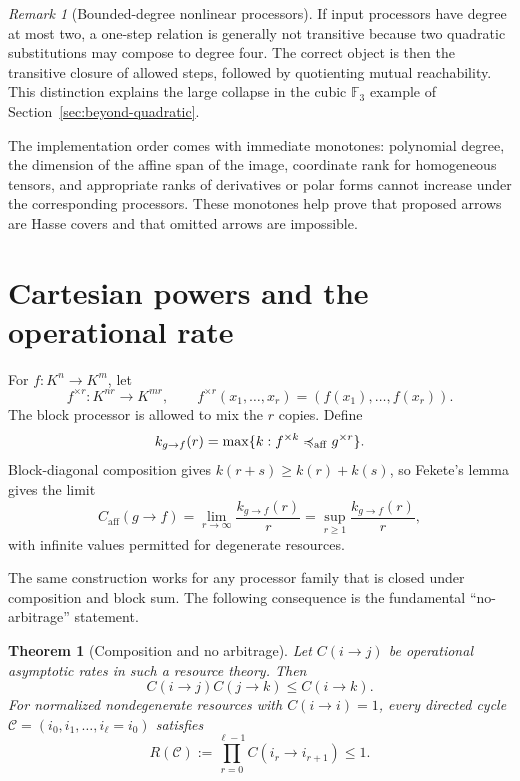 \documentclass[11pt]{article}
\theoremstyle{definition}
\theoremstyle{plain}
\newtheorem{theorem}[definition]{Theorem}
\theoremstyle{remark}
\newtheorem{remark}[definition]{Remark}
\newcommand{\F}{\mathbb F}
\newcommand{\impl}{\preccurlyeq}
\newcommand{\caff}{C_{\mathrm{aff}}}
\begin{document}
\begin{remark}[Bounded-degree nonlinear processors]
If input processors have degree at most two, a one-step relation is generally
not transitive because two quadratic substitutions may compose to degree
four.  The correct object is then the transitive closure of allowed steps,
followed by quotienting mutual reachability.  This distinction explains the
large collapse in the cubic \(\F_3\) example of
Section~\ref{sec:beyond-quadratic}.
\end{remark}

The implementation order comes with immediate monotones: polynomial degree,
the dimension of the affine span of the image, coordinate rank for homogeneous
tensors, and appropriate ranks of derivatives or polar forms cannot increase
under the corresponding processors.  These monotones help prove that proposed
arrows are Hasse covers and that omitted arrows are impossible.

\section{Cartesian powers and the operational rate}
\label{sec:rates}

For \(f:K^n\to K^m\), let
\[
  f^{\times r}:K^{nr}\longrightarrow K^{mr},
  \qquad
  f^{\times r}(x_1,\ldots,x_r)
  =(f(x_1),\ldots,f(x_r)).
\]
The block processor is allowed to mix the \(r\) copies.  Define
\[
  k_{g\to f}(r)
  =\max\{k:f^{\times k}\impl_{\rm aff}g^{\times r}\}.
\]
Block-diagonal composition gives
\(k(r+s)\ge k(r)+k(s)\), so Fekete's lemma gives the limit
\begin{equation}
  \caff(g\to f)
  =\lim_{r\to\infty}\frac{k_{g\to f}(r)}r
  =\sup_{r\ge1}\frac{k_{g\to f}(r)}r,
  \label{eq:affine-rate}
\end{equation}
with infinite values permitted for degenerate resources.

The same construction works for any processor family that is closed under
composition and block sum.  The following consequence is the fundamental
``no-arbitrage'' statement.

\begin{theorem}[Composition and no arbitrage]
Let \(C(i\to j)\) be operational asymptotic rates in such a resource theory.
Then
\begin{equation}
  C(i\to j)C(j\to k)\le C(i\to k).
  \label{eq:multiplicative-triangle}
\end{equation}
For normalized nondegenerate resources with \(C(i\to i)=1\), every directed
cycle \(\mathcal C=(i_0,i_1,\ldots,i_{\ell}=i_0)\) satisfies
\begin{equation}
  R(\mathcal C)
  :=\prod_{r=0}^{\ell-1}C(i_r\to i_{r+1})\le1.
  \label{eq:no-arbitrage-cycle}
\end{equation}
\end{theorem}
\end{document}
